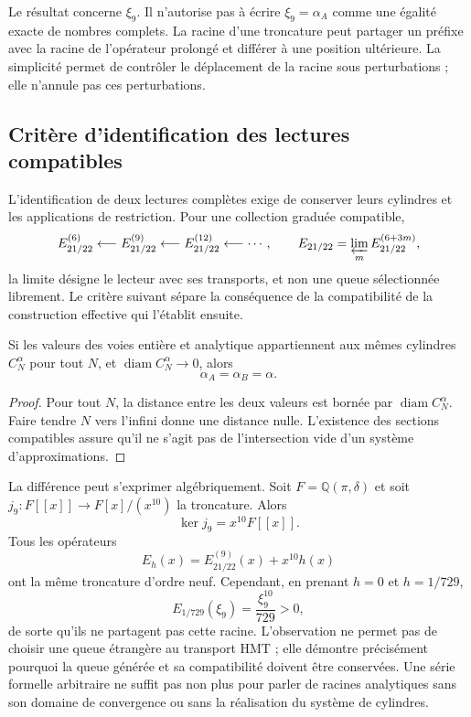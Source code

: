Le résultat concerne \(\xi_9\). Il n'autorise pas à écrire \(\xi_9=\alpha_A\) comme une égalité exacte de nombres complets. La racine d'une troncature peut partager un préfixe avec la racine de l'opérateur prolongé et différer à une position ultérieure. La simplicité permet de contrôler le déplacement de la racine sous perturbations ; elle n'annule pas ces perturbations.

\subsection{Critère d'identification des lectures compatibles}
\label{subsec:alpha-limite-dos-vias}

L'identification de deux lectures complètes exige de conserver leurs cylindres
et les applications de restriction. Pour une collection graduée compatible,
\[
 E_{21/22}^{(6)}\longleftarrow E_{21/22}^{(9)}
 \longleftarrow E_{21/22}^{(12)}\longleftarrow\cdots,
 \qquad
 E_{21/22}=\varprojlim_m E_{21/22}^{(6+3m)},
\]
la limite désigne le lecteur avec ses transports, et non une queue sélectionnée
librement. Le critère suivant sépare la conséquence de la
compatibilité de la construction effective qui l'établit ensuite.

\begin{proposition}
\label{prop:alpha-dos-limites}
Si les valeurs des voies entière et analytique appartiennent aux mêmes cylindres \(C_N^\alpha\) pour tout \(N\), et
\(\operatorname{diam}C_N^\alpha\to0\), alors
\[
 \alpha_A=\alpha_B=\alpha.
\]
\end{proposition}

\begin{proof}
Pour tout \(N\), la distance entre les deux valeurs est bornée
par \(\operatorname{diam}C_N^\alpha\). Faire tendre \(N\) vers l'infini
donne une distance nulle. L'existence des sections compatibles assure
qu'il ne s'agit pas de l'intersection vide d'un système d'approximations.
\end{proof}

La différence peut s'exprimer algébriquement. Soit \(F=\mathbb Q(\pi,\delta)\) et soit \(j_9:F[[x]]\to F[x]/(x^{10})\) la troncature. Alors
\[
 \ker j_9=x^{10}F[[x]].
\]
Tous les opérateurs
\[
 E_h(x)=E_{21/22}^{(9)}(x)+x^{10}h(x)
\]
ont la même troncature d'ordre neuf. Cependant, en prenant
\(h=0\) et \(h=1/729\),
\[
 E_{1/729}(\xi_9)=\frac{\xi_9^{10}}{729}>0,
\]
de sorte qu'ils ne partagent pas cette racine. L'observation ne permet pas de choisir une queue étrangère au transport HMT ; elle démontre précisément pourquoi la queue générée et sa compatibilité doivent être conservées. Une série formelle arbitraire ne suffit pas non plus pour parler de racines analytiques sans son domaine de convergence ou sans la réalisation du système de cylindres.


